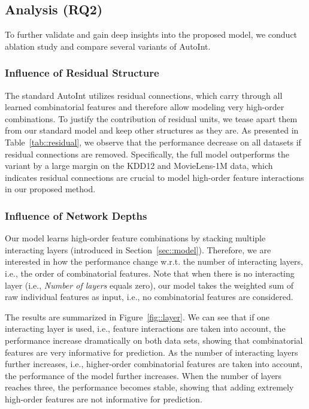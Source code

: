 \subsection{Analysis (RQ2)}
To further validate and gain deep insights into the proposed model, we conduct ablation study and compare several variants of AutoInt. 

\subsubsection{Influence of Residual Structure}
The standard AutoInt utilizes residual connections, which carry through all learned combinatorial features and therefore allow modeling very high-order combinations. To justify the contribution of residual units, we tease apart them from our standard model and keep other structures as they are. As presented in Table~\ref{tab::residual}, we observe that the performance decrease on all datasets if residual connections are removed. Specifically, the full model outperforms the variant by a large margin on the KDD12 and MovieLens-1M data, which indicates residual connections are crucial to model high-order feature interactions in our proposed method.



\subsubsection{Influence of Network Depths}
Our model learns high-order feature combinations by stacking multiple interacting layers (introduced in Section~\ref{sec::model}). Therefore, we are interested in how the performance change w.r.t. the number of interacting layers, i.e., the order of combinatorial features. Note that when there is no interacting layer (i.e., \textit{Number of layers} equals zero), our model takes the weighted sum of raw individual features as input, i.e., no combinatorial features are considered. 

The results are summarized in Figure~\ref{fig::layer}. We can see that if one interacting layer is used, i.e., feature interactions are taken into account, the performance increase dramatically on both data sets, showing that combinatorial features are very informative for prediction. As the number of interacting layers further increases, i.e., higher-order combinatorial features are taken into account, the performance of the model further increases. When the number of layers reaches three, the performance becomes stable, showing that adding extremely high-order features are not informative for prediction. 






